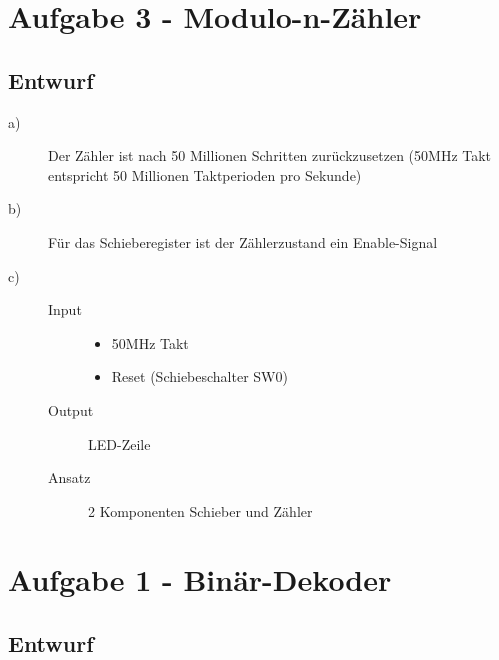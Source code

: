 \section{Aufgabe 3 - Modulo-n-Zähler}
\subsection{Entwurf}
\begin{description}
\item[a)] Der Zähler ist nach 50 Millionen Schritten zurückzusetzen (50MHz Takt entspricht 50 Millionen Taktperioden pro Sekunde)
\item[b)] Für das Schieberegister ist der Zählerzustand ein Enable-Signal
\item[c)] 
	\begin{description}
	\item[Input] 
		\begin{itemize}
			\item 50MHz Takt
			\item Reset (Schiebeschalter SW0)
		\end{itemize}
	\item[Output] LED-Zeile
	\item[Ansatz] 2 Komponenten Schieber und Zähler 
	\end{description}	
\end{description}
\section{Aufgabe 1 - Binär-Dekoder}
\subsection{Entwurf}

